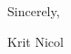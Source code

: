 \documentclass[a4paper,10pt]{article}
\begin{document}
\begin{comment}
In a team my skills substantially helped in create a website which can simulate a city
\end{comment}
\vspace{0.5cm}

\begin{comment}
\noindent
Before working at Macroworks, I was a web development intern at Spin.io in Detroit, Michigan, where I was primarily responsible for fixing bugs, implementing UI enhancements, maintaining pages via WordPress, and using HTML, CSS, and JavaScript to build and enhance web pages. I also assisted in the development and rollout of a widget that helps cyclists locate their nearest bike lane, which is now one of Spin.io's most popular products.

\vspace{0.5cm}

\noindent
At both Macroworks and Spin.io I demonstrated my ability to hit deadlines, maintain strong attention to detail, and produce top-notch code. I'm confident my skills will be put to good use at [Company Name]. Thank you for your consideration, and I look forward to hearing from you soon.

\vspace{0.5cm}
\end{comment}

\noindent
Sincerely,

\vspace{1cm}

\noindent
Krit Nicol
\end{document}
